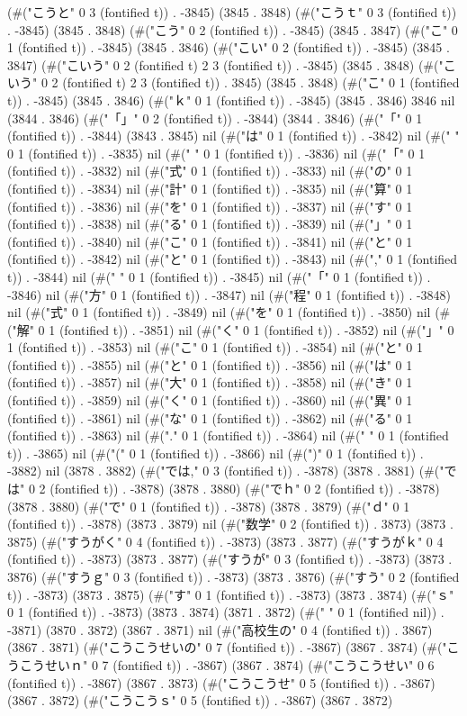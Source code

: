 (#("こうと" 0 3 (fontified t)) . -3845) (3845 . 3848) (#("こうｔ" 0 3 (fontified t)) . -3845) (3845 . 3848) (#("こう" 0 2 (fontified t)) . -3845) (3845 . 3847) (#("こ" 0 1 (fontified t)) . -3845) (3845 . 3846) (#("こい" 0 2 (fontified t)) . -3845) (3845 . 3847) (#("こいう" 0 2 (fontified t) 2 3 (fontified t)) . -3845) (3845 . 3848) (#("こいう" 0 2 (fontified t) 2 3 (fontified t)) . 3845) (3845 . 3848) (#("こ" 0 1 (fontified t)) . -3845) (3845 . 3846) (#("ｋ" 0 1 (fontified t)) . -3845) (3845 . 3846) 3846 nil (3844 . 3846) (#("「」" 0 2 (fontified t)) . -3844) (3844 . 3846) (#("「" 0 1 (fontified t)) . -3844) (3843 . 3845) nil (#("は" 0 1 (fontified t)) . -3842) nil (#("
" 0 1 (fontified t)) . -3835) nil (#(" " 0 1 (fontified t)) . -3836) nil (#("「" 0 1 (fontified t)) . -3832) nil (#("式" 0 1 (fontified t)) . -3833) nil (#("の" 0 1 (fontified t)) . -3834) nil (#("計" 0 1 (fontified t)) . -3835) nil (#("算" 0 1 (fontified t)) . -3836) nil (#("を" 0 1 (fontified t)) . -3837) nil (#("す" 0 1 (fontified t)) . -3838) nil (#("る" 0 1 (fontified t)) . -3839) nil (#("」" 0 1 (fontified t)) . -3840) nil (#("こ" 0 1 (fontified t)) . -3841) nil (#("と" 0 1 (fontified t)) . -3842) nil (#("と" 0 1 (fontified t)) . -3843) nil (#("," 0 1 (fontified t)) . -3844) nil (#(" " 0 1 (fontified t)) . -3845) nil (#("「" 0 1 (fontified t)) . -3846) nil (#("方" 0 1 (fontified t)) . -3847) nil (#("程" 0 1 (fontified t)) . -3848) nil (#("式" 0 1 (fontified t)) . -3849) nil (#("を" 0 1 (fontified t)) . -3850) nil (#("解" 0 1 (fontified t)) . -3851) nil (#("く" 0 1 (fontified t)) . -3852) nil (#("」" 0 1 (fontified t)) . -3853) nil (#("こ" 0 1 (fontified t)) . -3854) nil (#("と" 0 1 (fontified t)) . -3855) nil (#("と" 0 1 (fontified t)) . -3856) nil (#("は" 0 1 (fontified t)) . -3857) nil (#("大" 0 1 (fontified t)) . -3858) nil (#("き" 0 1 (fontified t)) . -3859) nil (#("く" 0 1 (fontified t)) . -3860) nil (#("異" 0 1 (fontified t)) . -3861) nil (#("な" 0 1 (fontified t)) . -3862) nil (#("る" 0 1 (fontified t)) . -3863) nil (#("." 0 1 (fontified t)) . -3864) nil (#(" " 0 1 (fontified t)) . -3865) nil (#("(" 0 1 (fontified t)) . -3866) nil (#(")" 0 1 (fontified t)) . -3882) nil (3878 . 3882) (#("では," 0 3 (fontified t)) . -3878) (3878 . 3881) (#("では" 0 2 (fontified t)) . -3878) (3878 . 3880) (#("でｈ" 0 2 (fontified t)) . -3878) (3878 . 3880) (#("で" 0 1 (fontified t)) . -3878) (3878 . 3879) (#("ｄ" 0 1 (fontified t)) . -3878) (3873 . 3879) nil (#("数学" 0 2 (fontified t)) . 3873) (3873 . 3875) (#("すうがく" 0 4 (fontified t)) . -3873) (3873 . 3877) (#("すうがｋ" 0 4 (fontified t)) . -3873) (3873 . 3877) (#("すうが" 0 3 (fontified t)) . -3873) (3873 . 3876) (#("すうｇ" 0 3 (fontified t)) . -3873) (3873 . 3876) (#("すう" 0 2 (fontified t)) . -3873) (3873 . 3875) (#("す" 0 1 (fontified t)) . -3873) (3873 . 3874) (#("ｓ" 0 1 (fontified t)) . -3873) (3873 . 3874) (3871 . 3872) (#(" " 0 1 (fontified nil)) . -3871) (3870 . 3872) (3867 . 3871) nil (#("高校生の" 0 4 (fontified t)) . 3867) (3867 . 3871) (#("こうこうせいの" 0 7 (fontified t)) . -3867) (3867 . 3874) (#("こうこうせいｎ" 0 7 (fontified t)) . -3867) (3867 . 3874) (#("こうこうせい" 0 6 (fontified t)) . -3867) (3867 . 3873) (#("こうこうせ" 0 5 (fontified t)) . -3867) (3867 . 3872) (#("こうこうｓ" 0 5 (fontified t)) . -3867) (3867 . 3872) 